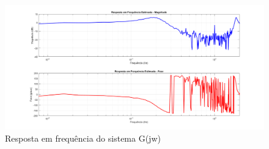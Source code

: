 \documentclass[10pt]{article}
\begin{document}
\begin{figure}[h]
    \centering
    \includegraphics[scale=0.2]{g.png}
    \caption{Resposta em frequência do sistema G(jw)}
\end{figure}

\newpage
\end{document}
